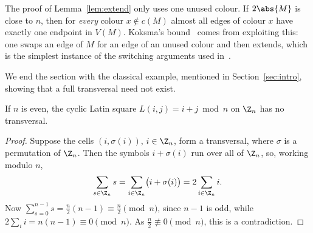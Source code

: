 \begin{remark}\label{rem:switch}
The proof of Lemma~\ref{lem:extend} only uses one unused colour. If $2\abs{M}$ is close to $n$, then for \emph{every} colour $x\notin c(M)$ almost all edges of colour $x$ have exactly one endpoint in $V(M)$. Koksma's bound~\cite{koksma1969} comes from exploiting this: one swaps an edge of $M$ for an edge of an unused colour and then extends, which is the simplest instance of the switching arguments used in~\cite{hatami2008,kpsy2022}.
\end{remark}

We end the section with the classical example, mentioned in Section~\ref{sec:intro}, showing that a full transversal need not exist.

\begin{claim}\label{claim:cyclic}
If $n$ is even, the cyclic Latin square $L(i,j)=i+j \bmod n$ on $\Z_n$ has no transversal.
\end{claim}

\begin{proof}
Suppose the cells $(i,\sigma(i))$, $i\in\Z_n$, form a transversal, where $\sigma$ is a permutation of $\Z_n$. Then the symbols $i+\sigma(i)$ run over all of $\Z_n$, so, working modulo $n$,
\[
\sum_{s\in\Z_n}s=\sum_{i\in\Z_n}\bigl(i+\sigma(i)\bigr)=2\sum_{i\in\Z_n}i .
\]
Now $\sum_{s=0}^{n-1}s=\frac n2(n-1)\equiv\frac n2 \pmod n$, since $n-1$ is odd, while $2\sum_i i=n(n-1)\equiv0\pmod n$. As $\frac n2\not\equiv0\pmod n$, this is a contradiction.
\end{proof}
